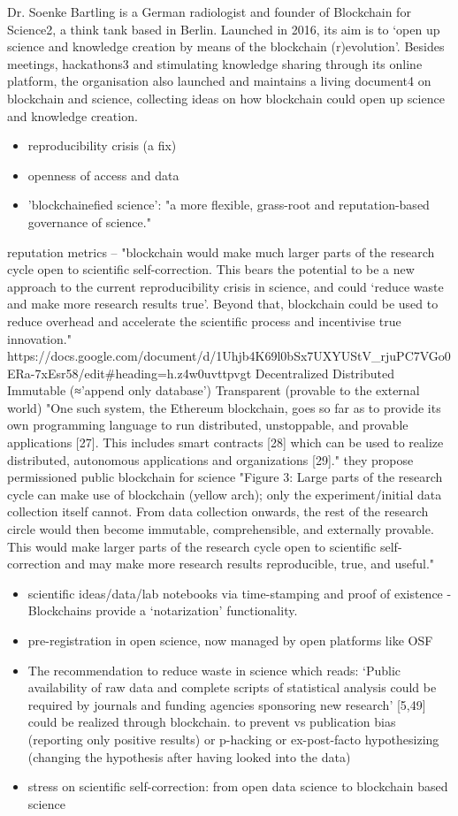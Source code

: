 \documentclass[runningheads]{llncs}
\begin{document}
Dr. Soenke Bartling is a German radiologist and founder of Blockchain for Science2, a think tank based in Berlin. Launched in 2016, its aim is to ‘open up science and knowledge creation by means of the blockchain (r)evolution’. Besides meetings, hackathons3 and stimulating knowledge sharing through its online platform, the organisation also launched and maintains a living document4 on blockchain and science, collecting ideas on how blockchain could open up science and knowledge creation.

\begin{itemize}
\item reproducibility crisis (a fix)
\item openness of access and data 
\item 'blockchainefied science':  "a more flexible, grass-root and reputation-based governance of science."
\end{itemize}
reputation metrics -- "blockchain would make much larger parts of the research cycle open to scientific self-correction. This bears the potential to be a new approach to the current reproducibility crisis in science, and could ‘reduce waste and make more research results true’. Beyond that, blockchain could be used to reduce overhead and accelerate the scientific process and incentivise true innovation." https://docs.google.com/document/d/1Uhjb4K69l0bSx7UXYUStV_rjuPC7VGo0ERa-7xEsr58/edit#heading=h.z4w0uvttpvgt
Decentralized
Distributed 
Immutable (≈’append only database’)
Transparent (provable to the external world)
"One such system, the Ethereum blockchain, goes so far as to provide its own programming language to run distributed, unstoppable, and provable applications [27]. This includes smart contracts [28] which can be used to realize distributed, autonomous applications and organizations [29]." they propose permissioned public blockchain for science
"Figure 3: Large parts of the research cycle can make use of blockchain (yellow arch); only the experiment/initial data collection itself cannot. From data collection onwards, the rest of the research circle would then become immutable, comprehensible, and externally provable. This would make larger parts of the research cycle open to scientific self-correction and may make more research results reproducible, true, and useful."
\begin{itemize}
\item scientific ideas/data/lab notebooks via time-stamping and proof of existence - Blockchains provide a ‘notarization’ functionality.
\item pre-registration in open science, now managed by open platforms like OSF 
\item The recommendation to reduce waste in science which reads: ‘Public availability of raw data and complete scripts of statistical analysis could be required by journals and funding agencies sponsoring new research’ [5,49] could be realized through blockchain. 
to prevent vs publication bias (reporting only positive results) or p-hacking or ex-post-facto hypothesizing (changing the hypothesis after having looked into the data)
\item stress on scientific self-correction: from open data science to blockchain based science 
\end{itemize}
\end{document}

